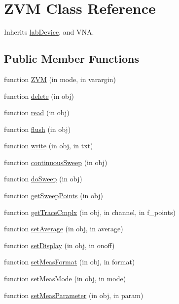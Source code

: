 \hypertarget{class_z_v_m}{}\section{Z\+VM Class Reference}
\label{class_z_v_m}


Inherits \hyperlink{classlab_device}{lab\+Device}, and V\+NA.

\subsection*{Public Member Functions}
\begin{DoxyCompactItemize}
\item 
function \hyperlink{class_z_v_m_a305759181353dc954271961d92a6718d}{Z\+VM} (in mode, in varargin)
\item 
function \hyperlink{class_z_v_m_a60bf89e4b0ab9c41105d54b72657cca1}{delete} (in obj)
\item 
function \hyperlink{class_z_v_m_af3911140bd2e9c2d372f6085189658f8}{read} (in obj)
\item 
function \hyperlink{class_z_v_m_adcb77d2a4cb6a10a4d045ab91540c3e1}{flush} (in obj)
\item 
function \hyperlink{class_z_v_m_aa94a75b704b56a4ecbc73dc8ce3870bc}{write} (in obj, in txt)
\item 
function \hyperlink{class_z_v_m_a257b1ef2269ceb632a7255f8d7eb691c}{continuous\+Sweep} (in obj)
\item 
function \hyperlink{class_z_v_m_ad05200443734a91ae55858023cb9e489}{do\+Sweep} (in obj)
\item 
function \hyperlink{class_z_v_m_ae184b648cd1a40e14745830b6e64caa6}{get\+Sweep\+Points} (in obj)
\item 
function \hyperlink{class_z_v_m_a62b5846f3b2aa046c714eeed38355e9d}{get\+Trace\+Cmplx} (in obj, in channel, in f\+\_\+points)
\item 
function \hyperlink{class_z_v_m_af88d3bca150c59d3fa8a853080a8d8d1}{set\+Average} (in obj, in average)
\item 
function \hyperlink{class_z_v_m_ad0a2ec0f5c015c66a082641c66a31130}{set\+Display} (in obj, in onoff)
\item 
function \hyperlink{class_z_v_m_ab6a1a5420d82e64aa0db2798a7f0c271}{set\+Meas\+Format} (in obj, in format)
\item 
function \hyperlink{class_z_v_m_ac087c6a910e00386fc16d32673f6c3d6}{set\+Meas\+Mode} (in obj, in mode)
\item 
function \hyperlink{class_z_v_m_a29cf6af35b5d80b9894adc3c6e13c9fc}{set\+Meas\+Parameter} (in obj, in param)

\end{DoxyCompactItemize}
